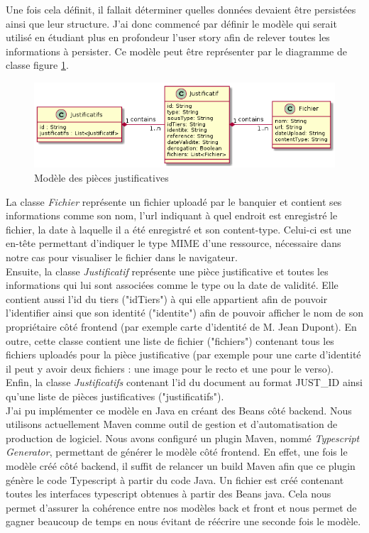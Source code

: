 	Une fois cela définit, il fallait déterminer quelles données devaient être persistées ainsi que leur structure. J'ai donc commencé par définir le modèle qui serait utilisé en étudiant plus en profondeur l'user story afin de relever toutes les informations à persister. Ce modèle peut être représenter par le diagramme de classe figure \ref{modelePJ}.	
	
\begin{figure}[h!]
	\includegraphics[scale=0.7]{images/travailBP1818/piecesJustif/modelePJ.png}
	\centering
	\caption{Modèle des pièces justificatives}
	\label{modelePJ}
\end{figure}

	La classe \textit{Fichier} représente un fichier uploadé par le banquier et contient ses informations comme son nom, l'url indiquant à quel endroit est enregistré le fichier, la date à laquelle il a été enregistré et son content-type. Celui-ci est une en-tête permettant d'indiquer le type MIME d'une ressource, nécessaire dans notre cas pour visualiser le fichier dans le navigateur. \\
	
	Ensuite, la classe \textit{Justificatif} représente une pièce justificative et toutes les informations qui lui sont associées comme le type ou la date de validité. Elle contient aussi l'id du tiers ("idTiers") à qui elle appartient afin de pouvoir l'identifier ainsi que son identité ("identite") afin de pouvoir afficher le nom de son propriétaire côté frontend (par exemple carte d'identité de M. Jean Dupont). En outre, cette classe contient une liste de fichier ("fichiers") contenant tous les fichiers uploadés pour la pièce justificative (par exemple pour une carte d'identité il peut y avoir deux fichiers : une image pour le recto et une pour le verso). \\
	
	Enfin, la classe \textit{Justificatifs} contenant l'id du document au format JUST\_ID ainsi qu'une liste de pièces justificatives ("justificatifs"). \\
	
	J'ai pu implémenter ce modèle en Java en créant des Beans côté backend. Nous utilisons actuellement Maven comme outil de gestion et d'automatisation de production de logiciel. Nous avons configuré un plugin Maven, nommé \textit{Typescript Generator}, permettant de générer le modèle côté frontend. En effet, une fois le modèle créé côté backend, il suffit de relancer un build Maven afin que ce plugin génère le code Typescript à partir du code Java. Un fichier est créé contenant toutes les interfaces typescript obtenues à partir des Beans java. Cela nous permet d'assurer la cohérence entre nos modèles back et front et nous permet de gagner beaucoup de temps en nous évitant de réécrire une seconde fois le modèle.
	  
